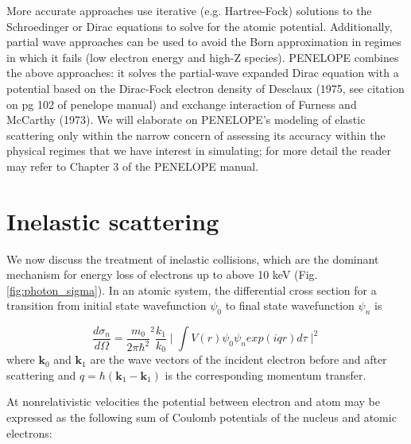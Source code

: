 \documentclass [11pt, proquest, article] {uwthesis}[2016/11/22]
\begin{document}
More accurate approaches use iterative (e.g. Hartree-Fock) solutions to the Schroedinger or Dirac equations to solve for the atomic potential.\cite{rez1984elastic} Additionally, partial wave approaches can be used to avoid the Born approximation in regimes in which it fails (low electron energy and high-Z species). PENELOPE combines the above approaches: it solves the partial-wave expanded Dirac equation with a potential based on the Dirac-Fock electron density of Desclaux (1975, see citation on pg 102 of penelope manual) and exchange interaction of Furness and McCarthy (1973). We will elaborate on PENELOPE's modeling of elastic scattering only within the narrow concern of assessing its accuracy within the physical regimes that we have interest in simulating; for more detail the reader may refer to Chapter 3 of the PENELOPE manual. 



\section{Inelastic scattering}
We now discuss the treatment of inelastic collisions, which are the dominant mechanism for energy loss of electrons up to above 10 keV (Fig. \ref{fig:photon_sigma}).  In an atomic system, the differential cross section for a transition from initial state wavefunction $\psi_0$ to final state wavefunction $\psi_n$ is

\begin{equation} \label{bornDCS}
\frac{d\sigma_n}{d\Omega} = \frac{m_0}{2\pi \hbar^2}^2 \frac{k_1}{k_0} \mid \int V(r) \psi_0 \psi_n exp(i q r) d\tau \mid ^2
\end{equation}
where $\textbf{k}_0$ and $\textbf{k}_1$ are the wave vectors of the incident electron before and after scattering and $q = \hbar (\textbf{k}_1 - \textbf{k}_1)$ is the corresponding momentum transfer.\cite{fano1963penetration} 

At nonrelativistic velocities the potential between electron and atom may be expressed as the following sum of Coulomb potentials of the nucleus and atomic electrons:
\end{document}
